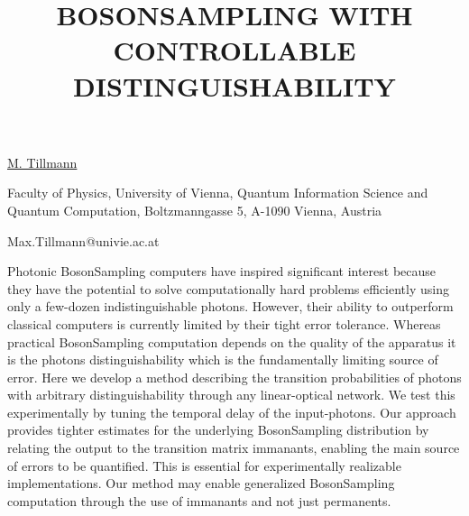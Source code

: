 \title{BOSONSAMPLING WITH CONTROLLABLE DISTINGUISHABILITY}

\underline{M. Tillmann} 

{\normalsize{\vspace{-4mm}
Faculty of Physics, University of Vienna,
Quantum Information Science and Quantum Computation,
Boltzmanngasse 5, A-1090 Vienna, Austria

\email Max.Tillmann@univie.ac.at}}

Photonic BosonSampling computers have inspired significant interest because they have the potential to solve computationally hard problems efficiently using only a few-dozen indistinguishable photons. However, their ability to outperform classical computers is currently limited by their tight error tolerance. Whereas practical BosonSampling computation depends on the quality of the apparatus it is the photons distinguishability which is the fundamentally limiting source of error. Here we develop a method describing the transition probabilities of photons with arbitrary distinguishability through any linear-optical network. We test this experimentally by tuning the temporal delay of the input-photons. Our approach provides tighter estimates for the underlying BosonSampling distribution by relating the output to the transition matrix immanants, enabling the main source of errors to be quantified. This is essential for experimentally realizable implementations. Our method may enable generalized BosonSampling computation through the use of immanants and not just permanents. 



\vspace{\baselineskip}
